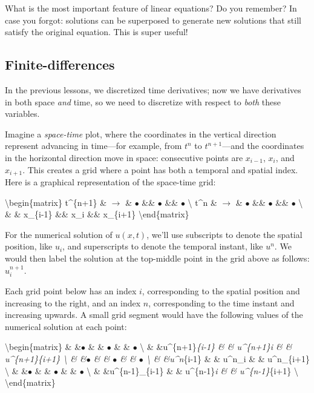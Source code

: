 \documentclass{article}
\begin{document}
What is the most important feature of linear equations? Do you remember?
In case you forgot: solutions can be superposed to generate new
solutions that still satisfy the original equation. This is super
useful!

    \subsection{Finite-differences}\label{finite-differences}

    In the previous lessons, we discretized time derivatives; now we have
derivatives in both space \emph{and} time, so we need to discretize with
respect to \emph{both} these variables.

Imagine a \emph{space-time} plot, where the coordinates in the vertical
direction represent advancing in time---for example, from \(t^n\) to
\(t^{n+1}\)---and the coordinates in the horizontal direction move in
space: consecutive points are \(x_{i-1}\), \(x_i\), and \(x_{i+1}\).
This creates a grid where a point has both a temporal and spatial index.
Here is a graphical representation of the space-time grid:

\textbackslash{}begin\{matrix\} t\^{}\{n+1\} \& $\rightarrow$ \&
$\bullet$  \&\& $\bullet$  \&\& $\bullet$  \textbackslash{} t\^{}n \&
$\rightarrow$ \& $\bullet$  \&\& $\bullet$  \&\& $\bullet$  \textbackslash{} \&
\& x\_\{i-1\} \&\& x\_i \&\& x\_\{i+1\} \textbackslash{}end\{matrix\}

For the numerical solution of \(u(x,t)\), we'll use subscripts to denote
the spatial position, like \(u_i\), and superscripts to denote the
temporal instant, like \(u^n\). We would then label the solution at the
top-middle point in the grid above as follows: \(u^{n+1}_{i}\).

Each grid point below has an index \(i\), corresponding to the spatial
position and increasing to the right, and an index \(n\), corresponding
to the time instant and increasing upwards. A small grid segment would
have the following values of the numerical solution at each point:

\textbackslash{}begin\{matrix\} \& \&$\bullet$ \& \& $\bullet$ \& \&
$\bullet$ \textbackslash{} \& \&u\^{}\{n+1\}\emph{\{i-1\} \& \&
u\^{}\{n+1\}\emph{i \& \& u\^{}\{n+1\}}\{i+1\} \textbackslash{} \&
\&$\bullet$ \& \& $\bullet$ \& \& $\bullet$ \textbackslash{} \&
\&u\^{}n}\{i-1\} \& \& u\^{}n\_i \& \& u\^{}n\_\{i+1\} \textbackslash{}
\& \&$\bullet$ \& \& $\bullet$ \& \& $\bullet$ \textbackslash{} \&
\&u\^{}\{n-1\}\_\{i-1\} \& \& u\^{}\{n-1\}\emph{i \& \&
u\^{}\{n-1\}}\{i+1\} \textbackslash{} \textbackslash{}end\{matrix\}
\end{document}
